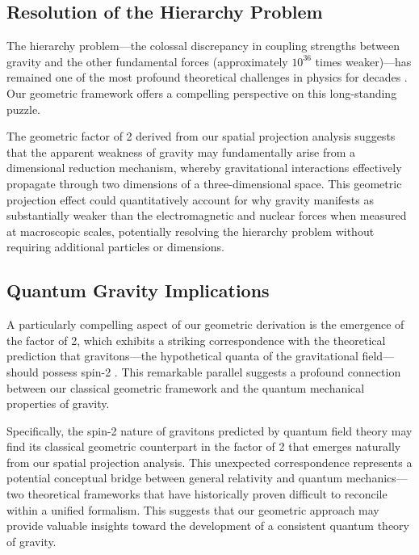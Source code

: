\documentclass[12pt]{article}
\numberwithin{equation}{section}
\begin{document}
\subsection{Resolution of the Hierarchy Problem}

The hierarchy problem—the colossal discrepancy in coupling strengths between gravity and the other fundamental forces (approximately $10^{36}$ times weaker)—has remained one of the most profound theoretical challenges in physics for decades \citep{wells2017hierarchy}. Our geometric framework offers a compelling perspective on this long-standing puzzle.

The geometric factor of 2 derived from our spatial projection analysis suggests that the apparent weakness of gravity may fundamentally arise from a dimensional reduction mechanism, whereby gravitational interactions effectively propagate through two dimensions of a three-dimensional space. This geometric projection effect could quantitatively account for why gravity manifests as substantially weaker than the electromagnetic and nuclear forces when measured at macroscopic scales, potentially resolving the hierarchy problem without requiring additional particles or dimensions.

\subsection{Quantum Gravity Implications}

A particularly compelling aspect of our geometric derivation is the emergence of the factor of 2, which exhibits a striking correspondence with the theoretical prediction that gravitons—the hypothetical quanta of the gravitational field—should possess spin-2 \citep{feynman1964,carroll2004}. This remarkable parallel suggests a profound connection between our classical geometric framework and the quantum mechanical properties of gravity.

Specifically, the spin-2 nature of gravitons predicted by quantum field theory may find its classical geometric counterpart in the factor of 2 that emerges naturally from our spatial projection analysis. This unexpected correspondence represents a potential conceptual bridge between general relativity and quantum mechanics—two theoretical frameworks that have historically proven difficult to reconcile within a unified formalism. This suggests that our geometric approach may provide valuable insights toward the development of a consistent quantum theory of gravity.
\end{document}
